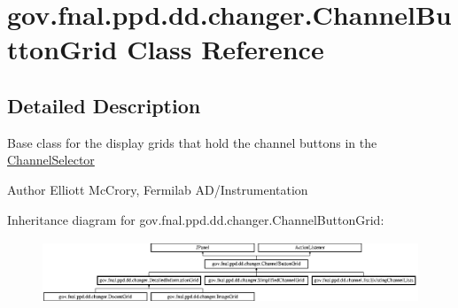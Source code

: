 \hypertarget{classgov_1_1fnal_1_1ppd_1_1dd_1_1changer_1_1ChannelButtonGrid}{\section{gov.\-fnal.\-ppd.\-dd.\-changer.\-Channel\-Button\-Grid Class Reference}
\label{classgov_1_1fnal_1_1ppd_1_1dd_1_1changer_1_1ChannelButtonGrid}
}


\subsection{Detailed Description}
Base class for the display grids that hold the channel buttons in the \hyperlink{classgov_1_1fnal_1_1ppd_1_1dd_1_1ChannelSelector}{Channel\-Selector}

\begin{DoxyAuthor}{Author}
Elliott Mc\-Crory, Fermilab A\-D/\-Instrumentation 
\end{DoxyAuthor}
Inheritance diagram for gov.\-fnal.\-ppd.\-dd.\-changer.\-Channel\-Button\-Grid\-:\begin{figure}[H]
\begin{center}
\leavevmode
\includegraphics[height=1.891892cm]{classgov_1_1fnal_1_1ppd_1_1dd_1_1changer_1_1ChannelButtonGrid}
\end{center}
\end{figure}
